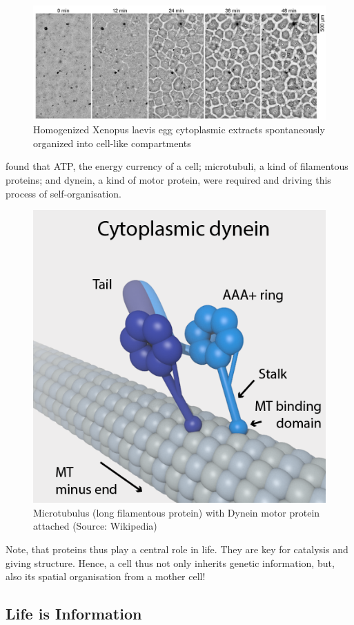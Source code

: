 \documentclass[
  11pt,
]{book}
\begin{document}
\begin{figure}

{\centering \includegraphics[width=1\linewidth]{./figs/selforganisation} 

}

\caption{Homogenized Xenopus laevis egg cytoplasmic extracts spontaneously organized into cell-like compartments \citep{Cheng2019}}\label{fig:selforganisation}
\end{figure}

\citet{Cheng2019} found that ATP, the energy currency of a cell; microtubuli, a kind of filamentous proteins; and dynein, a kind of motor protein, were required and driving this process of self-organisation.

\begin{figure}

{\centering \includegraphics[width=0.3\linewidth]{./figs/DyneinHeavyChainOnMT} 

}

\caption{Microtubulus (long filamentous protein) with Dynein motor protein attached (Source:  Wikipedia)}\label{fig:dynein}
\end{figure}

Note, that proteins thus play a central role in life. They are key for catalysis and giving structure. Hence, a cell thus not only inherits genetic information, but, also its spatial organisation from a mother cell!

\newpage

\hypertarget{lifeInformation}{%
\subsection{Life is Information}\label{lifeInformation}}
\end{document}
